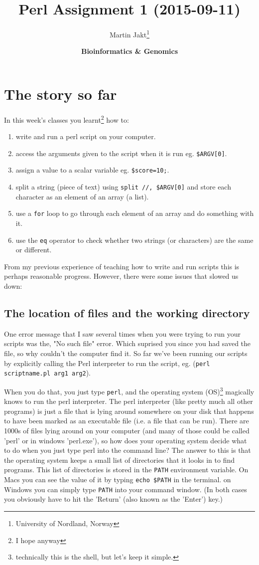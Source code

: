 \documentclass[11pt]{article}
\author{Martin Jakt\thanks{University of Nordland, Norway}}
\date{\textbf{Bioinformatics \& Genomics}}
\title{\textbf{Perl Assignment 1} (2015-09-11)}
\begin{document}
\maketitle

\section{The story so far}
\label{sec-1}
In this week's classes you learnt\footnote{I hope anyway} how to: 
\begin{enumerate}
\item write and run a perl script on your computer.
\item access the arguments given to the script when it is run eg. \texttt{\$ARGV[0]}.
\item assign a value to a scalar variable eg. \texttt{\$score=10;}.
\item split a string (piece of text) using \texttt{split //, \$ARGV[0]} and store each character
  as an element of an array (a list).
\item use a \texttt{for} loop to go through each element of an array and do something with it.
\item use the \texttt{eq} operator to check whether two strings (or characters) are the same or different.
\end{enumerate}

From my previous experience of teaching how to write and run scripts this
is perhaps reasonable progress. However, there were some issues that slowed us
down:

\subsection{The location of files and the working directory}
\label{sec-1-1}
One error message that I saw several times when you were trying to
run your scripts was the, "No such file" error. Which suprised you since
you had saved the file, so why couldn't the computer find it. So far we've been running our scripts by explicitly
calling the Perl interpreter to run the script, eg. (\texttt{perl scriptname.pl arg1 arg2}).

When you do that, you just type \texttt{perl}, and the operating system (OS)\footnote{technically this is
the shell, but let's keep it simple.} magically knows to run the perl interpreter.
The perl interpreter (like pretty much all other programs) is just a file that is lying around
somewhere on your disk that happens to have been marked as an executable file (i.e. a file
that can be run). There are 1000s of files lying around on your computer (and many of those could be called 'perl'
or in windows 'perl.exe'), so how
does your operating system decide what to do when you just type perl into the command line?
The answer to this is that the operating system keeps a small list of directories that it
looks in to find programs. This list of directories is stored
in the \texttt{PATH} environment variable. On Macs you can see the value of it by
typing \texttt{echo \$PATH} in the terminal. on Windows you can simply type \texttt{PATH} into your command
window. (In both cases you obviously have to hit the 'Return' (also known as the 'Enter') key.)
\end{document}
